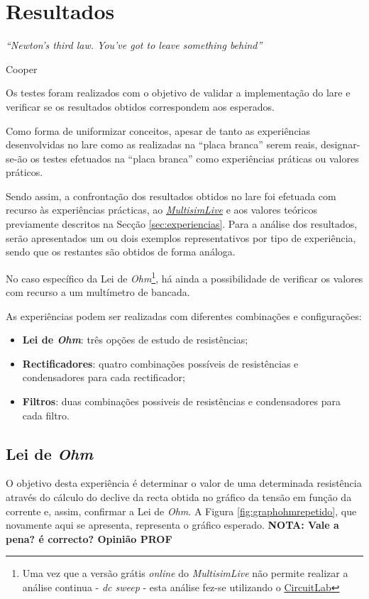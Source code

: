\label{Capítulo5}
\chapter{Resultados}
\begin{center}
    \textit{``Newton's third law. You've got to leave something behind''}
     
     Cooper
\end{center}
Os testes foram realizados com o objetivo de validar a implementação do \acrshort{lare} e verificar se os resultados obtidos correspondem aos esperados. 

Como forma de uniformizar conceitos, apesar de tanto as experiências desenvolvidas no \acrshort{lare} como as realizadas na ``placa branca'' serem reais, designar-se-ão os testes efetuados na ``placa branca'' como experiências práticas ou valores práticos.

Sendo assim, a confrontação dos resultados obtidos no \acrshort{lare} foi efetuada com recurso às experiências prácticas, ao \href{https://www.multisim.com}{\textit{MultisimLive}} e aos valores teóricos previamente descritos na Secção \ref{sec:experiencias}. Para a análise dos resultados, serão apresentados um ou dois exemplos representativos por tipo de experiência, sendo que os restantes são obtidos de forma análoga.

No caso específico da Lei de \textit{Ohm}\footnote{Uma vez que a versão grátis \textit{online} do \textit{MultisimLive} não permite realizar a análise continua - \textit{dc sweep} - esta análise fez-se utilizando o \href{https://www.circuitlab.com/}{CircuitLab}}, há ainda a possibilidade de verificar os valores com recurso a um multímetro de bancada.

As experiências podem ser realizadas com diferentes combinações e configurações:
\begin{itemize}
	\item \textbf{Lei de \textit{Ohm}}: três opções de estudo de resistências;
	\item \textbf{Rectificadores}: quatro combinações possíveis de resistências e condensadores para cada rectificador;
	\item \textbf{Filtros}: duas combinações possiveis de resistências e condensadores para cada filtro.
\end{itemize}

\section{Lei de \textit{Ohm}}
\label{sec:resultados_lei_de_ohm}
O objetivo desta experiência é determinar o valor de uma determinada resistência através do cálculo do declive da recta obtida no gráfico da tensão em função da corrente e, assim, confirmar a Lei de \textit{Ohm}. A Figura \ref{fig:graphohmrepetido}, que novamente aqui se apresenta, representa o gráfico esperado. \textbf{NOTA: Vale a pena? é correcto? Opinião PROF}


